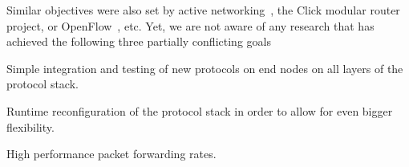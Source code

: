 \documentclass{sig-alternate}
\begin{document}

Similar objectives were also set by active networking~\cite{ANSurvey2}, the Click modular router
project\cite{click}, or OpenFlow~\cite{openflow}, etc. 
Yet, we are not aware of any research that has achieved the following three partially conflicting goals 
\begin{compactenum}
\item Simple integration and testing of new protocols on end nodes on all layers of the protocol stack.
\item Runtime reconfiguration of the protocol stack in order to allow for even bigger flexibility.
\item High performance packet forwarding rates.
\end{compactenum}
\end{document}
